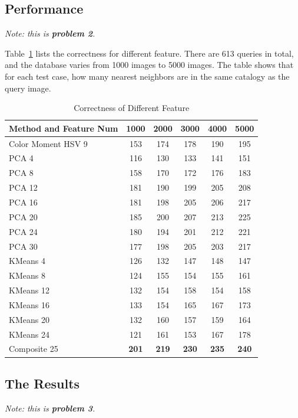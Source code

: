 \documentclass{acm_proc_article-sp}
\begin{document}
\subsection{Performance}
\emph{Note: this is \textbf{problem 2}.}

Table~\ref{table:correctness} lists the correctness for different feature.
There are 613 queries in total, and the database varies from 1000 images
    to 5000 images.
The table shows that for each test case,
    how many nearest neighbors are in the same catalogy as
    the query image.
\begin{table} \centering 
\begin{tabular}{|p{2.1cm}|c|c|c|c|c|}
    \hline
    Method and Feature Num & 1000 & 2000 & 3000 & 4000 & 5000 \\ \hline
    Color Moment HSV 9 & 153 & 174 & 178 & 190 & 195 \\ \hline
    PCA 4 & 116 & 130 & 133 & 141 & 151 \\ \hline
    PCA 8 & 158 & 170 & 172 & 176 & 183 \\ \hline
    PCA 12 & 181 & 190 & 199 & 205 & 208 \\ \hline
    PCA 16 & 181 & 198 & 205 & 206 & 217 \\ \hline
    PCA 20 & 185 & 200 & 207 & 213 & 225 \\ \hline
    PCA 24 & 180 & 194 & 201 & 212 & 221 \\ \hline
    PCA 30 & 177 & 198 & 205 & 203 & 217 \\ \hline
    KMeans 4 & 126 & 132 & 147 & 148 & 147 \\ \hline
    KMeans 8 & 124 & 155 & 154 & 155 & 161 \\ \hline
    KMeans 12 & 132 & 154 & 158 & 154 & 158 \\ \hline
    KMeans 16 & 133 & 154 & 165 & 167 & 173 \\ \hline
    KMeans 20 & 132 & 160 & 157 & 159 & 164 \\ \hline
    KMeans 24 & 121 & 161 & 153 & 167 & 178 \\ \hline
    Composite 25 & \textbf{201} & \textbf{219} & \textbf{230} & \textbf{235} &
    \textbf{240} \\ \hline
\end{tabular} 
\caption{Correctness of Different Feature}
\label{table:correctness}
\end{table}

\subsection{The Results}
\emph{Note: this is \textbf{problem 3}. }
\end{document}
